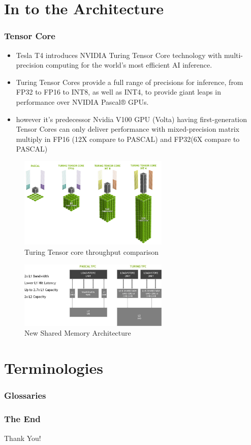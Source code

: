 \documentclass[xcolor=x11names,table]{beamer}
\begin{document}
\section{In to the Architecture}
    \begin{frame}[allowframebreaks]
    \frametitle{Tensor Core}
        \begin{itemize}
            \item Tesla T4 introduces NVIDIA Turing Tensor Core technology with multi-precision computing for the world’s most efficient AI inference. 
            
            \item Turing Tensor Cores provide a full range of precisions for inference, from FP32 to FP16 to INT8, as well as INT4, to provide giant leaps in performance over NVIDIA Pascal® GPUs.
            
            \item however it's predecessor Nvidia V100 GPU (Volta) having first-generation Tensor Cores can only deliver performance with mixed-precision matrix multiply in FP16 (12X compare to PASCAL) and FP32(6X compare to PASCAL)
        \end{itemize}
        
        \begin{figure}[H]
            \includegraphics[width=270px]{refs/turing-throughput-tensor.jpg}
            \caption{Turing Tensor core throughput comparison}
        \end{figure}
        
        \begin{figure}
            \centering
            \includegraphics[width=270px]{refs/image3.jpg}
            \caption{New Shared Memory Architecture}
            \label{fig:newSM}
        \end{figure}
    \end{frame}

\section{Terminologies}
    \begin{frame}[allowframebreaks]
    \frametitle{Glossaries}
        \printglossaries
    \end{frame}

    \begin{frame}
    \frametitle{The End}
    \centering
    {\fontsize{40}{50}\selectfont Thank You!}
    \end{frame}
\end{document}
